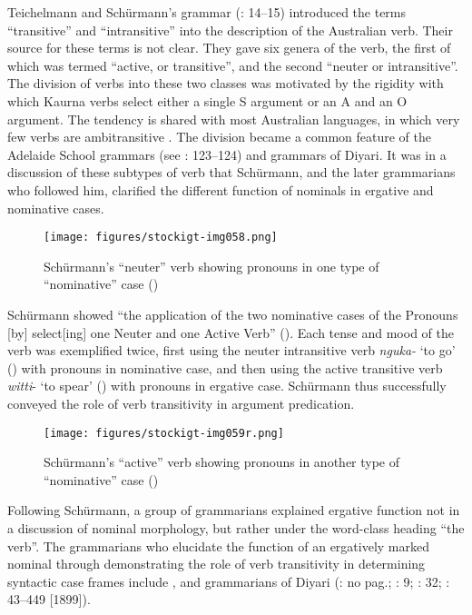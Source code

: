Teichelmann and Schürmann’s grammar (\citeyear{teichelmann_outlines_1840}: 14--15) introduced the terms “transitive” and “intransitive” into the description of the Australian verb. Their source for these terms is not clear. They gave six genera of the verb, the first of which was termed ``active, or transitive'', and the second ``neuter or intransitive''. The division of verbs into these two classes was motivated by the rigidity with which Kaurna verbs select either a single S argument or an A and an O argument. The tendency is shared with most Australian languages, in which very few verbs are ambitransitive \citep[176--178]{dixon_preface_2002}. The division became a common feature of the Adelaide School grammars (see \citealt{simpson_i_2008}: 123--124) and grammars of Diyari. It was in a discussion of these subtypes of verb that Schürmann, and the later grammarians who followed him, clarified the different function of nominals in ergative and nominative cases.

\begin{figure}[b]
\texttt{[image: figures/stockigt-img058.png]}
\caption{Schürmann’s “neuter” verb showing pronouns in one type of “nominative” case (\citeyear[17]{schurmann_vocabulary_1844})}
\label{fig:key:112}
\end{figure}

Schürmann showed “the application of the two nominative cases of the Pronouns [by] select[ing] one Neuter and one Active Verb” (\citeyear[16]{schurmann_vocabulary_1844}). Each tense and mood of the verb was exemplified twice, first using the neuter intransitive verb \textit{nguka-} `to go' () with pronouns in nominative case, and then using the active transitive verb \textit{witti}{}- `to spear' () with pronouns in ergative case. Schürmann thus successfully conveyed the role of verb transitivity in argument predication.




\begin{figure}
\texttt{[image: figures/stockigt-img059r.png]}
\caption{Schürmann’s “active” verb showing pronouns in another type of “nominative” case (\citeyear[20]{schurmann_vocabulary_1844})}
\label{fig:key:113}
\end{figure}

Following Schürmann, a group of grammarians explained ergative function not in a discussion of nominal morphology, but rather under the word-class heading ``the verb''. The grammarians who elucidate the function of an ergatively marked nominal through demonstrating the role of verb transitivity in determining syntactic case frames include \citet[19]{Moorhouse1846}, \citet[14]{taplin_grammar_1880} and grammarians of Diyari (\citealt{koch_untitled_1868}: no pag.; \citealt{schoknecht_grammar_1947}: 9; \citealt{flierl_christianieli_1880}: 32; \citealt{reuther_three_1981}: 43--449 [1899]).

